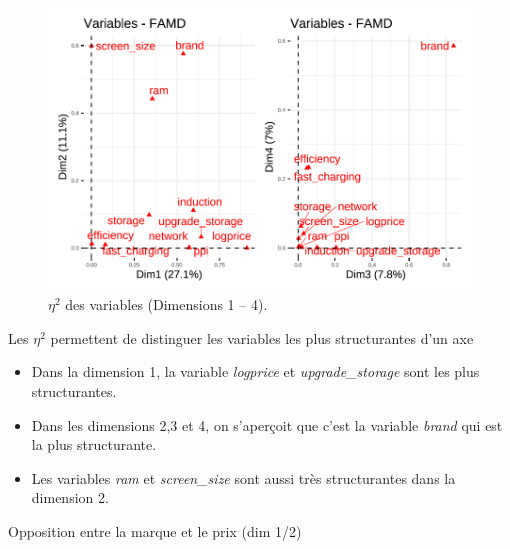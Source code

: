 \documentclass[
  12pt,
]{report}
\begin{document}
\begin{figure}[H]

{\centering \includegraphics{report_files/figure-pdf/unnamed-chunk-16-1.pdf}

}

\caption{\(\eta^2\) des variables (Dimensions 1 -- 4).}

\end{figure}%

\newpage

Les \(\eta^2\) permettent de distinguer les variables les plus
structurantes d'un axe

\begin{itemize}
\item
  Dans la dimension 1, la variable \emph{logprice} et
  \emph{upgrade\_storage} sont les plus structurantes.
\item
  Dans les dimensions 2,3 et 4, on s'aperçoit que c'est la variable
  \emph{brand} qui est la plus structurante.
\item
  Les variables \emph{ram} et \emph{screen\_size} sont aussi très
  structurantes dans la dimension 2.
\end{itemize}

Opposition entre la marque et le prix (dim 1/2)
\end{document}
